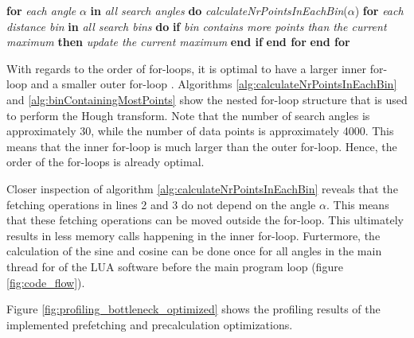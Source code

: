 \begin{algorithm}
    \begin{algorithmic}[1]
        \State \textbf{for} \textit{each angle} $\alpha$ \textbf{in} \textit{all search angles} \textbf{do}
        \State \hspace{1cm} \textit{calculateNrPointsInEachBin}($\alpha$)
        \State  \hspace{1cm} \textbf{for} \textit{each distance bin} \textbf{in} \textit{all search bins} \textbf{do}
        \State \hspace{2cm} \textbf{if} \textit{bin contains more points than the current maximum} \textbf{then}
        \State \hspace{3cm} \textit{update the current maximum}
        \State \hspace{2cm} \textbf{end if}
        \State \hspace{1cm} \textbf{end for}
        \State \textbf{end for}
        \EndFunction
    \end{algorithmic}
    \caption{Pseudo code of the function \lstinline[language=c]|LineFinder::calculateBinContainingMostPoints|.}
    \label{alg:binContainingMostPoints}
\end{algorithm}

With regards to the order of for-loops, it is optimal to have a larger inner for-loop and a smaller outer for-loop \cite[lecture 7, "temporal locality" ]{scientific_programming}. Algorithms \ref{alg:calculateNrPointsInEachBin} and \ref{alg:binContainingMostPoints} show the nested for-loop structure that is used to perform the Hough transform. Note that the number of search angles is approximately 30, while the number of data points is approximately 4000. This means that the inner for-loop is much larger than the outer for-loop. Hence, the order of the for-loops is already optimal.

Closer inspection of algorithm \ref{alg:calculateNrPointsInEachBin} reveals that the fetching operations in lines 2 and 3 do not depend on the angle $\alpha$. This means that these fetching operations can be moved outside the for-loop. This ultimately results in less memory calls happening in the inner for-loop. Furtermore, the calculation of the sine and cosine can be done once for all angles in the main thread for of the LUA software before the main program loop (figure \ref{fig:code_flow}).

Figure \ref{fig:profiling_bottleneck_optimized} shows the profiling results of the implemented prefetching and precalculation optimizations.

